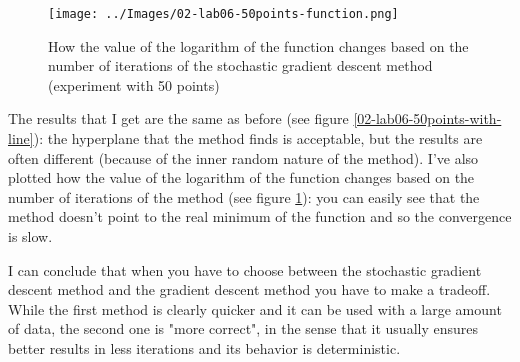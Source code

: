     \begin{figure}
        \centering
        \texttt{[image: ../Images/02-lab06-50points-function.png]}
        \caption{How the value of the logarithm of the function changes based on the number of iterations of the stochastic gradient descent method (experiment with 50 points)}
        \label{03-lab06-50points-function}
    \end{figure}
    The results that I get are the same as before (see figure \ref{02-lab06-50points-with-line}): the hyperplane that the method finds is acceptable, but the results are often different (because of the inner random nature of the method). I've also plotted how the value of the logarithm of the function changes based on the number of iterations of the method (see figure \ref{03-lab06-50points-function}): you can easily see that the method doesn't point to the real minimum of the function and so the convergence is slow.\par
    I can conclude that when you have to choose between the stochastic gradient descent method and the gradient descent method you have to make a tradeoff. While the first method is clearly quicker and it can be used with a large amount of data, the second one is "more correct", in the sense that it usually ensures better results in less iterations and its behavior is deterministic.